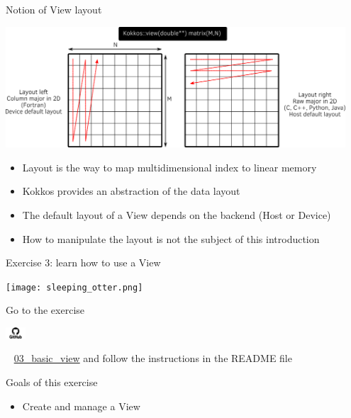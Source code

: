\documentclass[aspectratio=169]{beamer}
\newcommand{\githublink}[2][2em]{%
    \hspace{-0.25em}%
    \parbox[c][#1][c]{#1}{%
        \includegraphics[width=#1]{GitHub-logo.png}%
    }%
    \hspace{-0.25em}%
    ~%
    #2%
}
\begin{document}

\begin{frame}{Notion of View layout}
    \begin{center}
        \includegraphics[width=0.95\textwidth]{layout_right_left.png}
    \end{center}
    \begin{itemize}
        \item Layout is the way to map multidimensional index to linear memory
        \item Kokkos provides an abstraction of the data layout
        \item The default layout of a View depends on the backend (Host or Device)
        \item How to manipulate the layout is not the subject of this introduction
    \end{itemize}
\end{frame}


\begin{frame}{Exercise 3: learn how to use a View}
    \begin{center}
        \texttt{[image: sleeping\_otter.png]}
    \end{center}

    Go to the exercise \githublink{\href{https://github.com/CExA-project/cexa-kokkos-tutorials/tree/main/exercises/03_basic_view}{03\_basic\_view}} and follow the instructions in the README file

    \begin{block}{Goals of this exercise}
        \begin{itemize}
            \item Create and manage a View
        \end{itemize}
    \end{block}
\end{frame}
\end{document}
